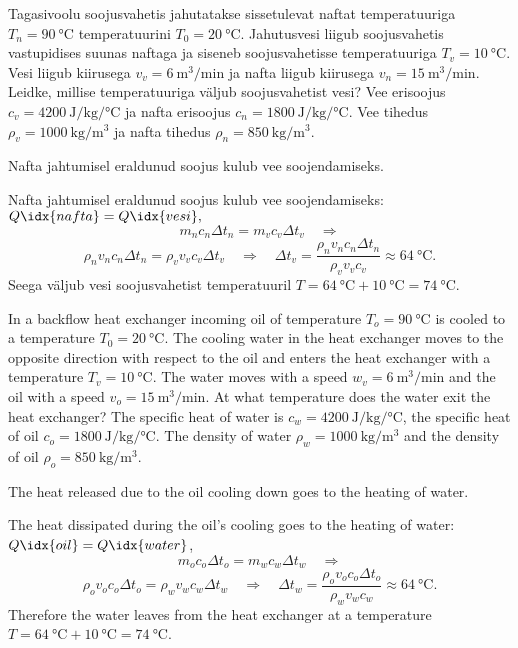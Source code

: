 
Tagasivoolu soojusvahetis jahutatakse sissetulevat naftat temperatuuriga $T_{n}=\SI{90}{\degreeCelsius}$ temperatuurini $T_{0}=\SI{20}{\degreeCelsius}$. 
Jahutusvesi liigub soojusvahetis vastupidises suunas naftaga ja siseneb soojusvahetisse temperatuuriga $T_{v}=\SI{10}{\degreeCelsius}$.
Vesi liigub kiirusega $v_{v}=\SI{6}{\m^3\per\minute}$ 
ja nafta liigub kiirusega $v_{n}=\SI{15}{\m^3\per\minute}$. 
Leidke, millise temperatuuriga väljub soojusvahetist vesi? Vee erisoojus $c_{v}=\SI{4200}{\joule\per\kilogram\per\degreeCelsius}$ 
ja nafta erisoojus $c_{n}=\SI{1800}{\joule\per\kilogram\per\degreeCelsius}$. Vee tihedus $\rho_{v}=\SI{1000}{\kilogram\per\metre\cubed}$ ja nafta tihedus $\rho_{n}=\SI{850}{\kilogram\per\metre\cubed}$.

\hint
Nafta jahtumisel eraldunud soojus kulub vee soojendamiseks.

\solu
Nafta jahtumisel eraldunud soojus kulub vee soojendamiseks: $Q\idx{nafta} = Q\idx{vesi},$
\[ m_nc_n\Delta t_n = m_vc_v\Delta t_v \quad\Rightarrow \]
\[ \rho_nv_nc_n\Delta t_n = \rho_v v_vc_v\Delta t_v \quad\Rightarrow\quad \Delta t_v = \frac{\rho_nv_nc_n\Delta t_n}{\rho_vv_vc_v} \approx \SI{64}{\degreeCelsius}. \]
Seega väljub vesi soojusvahetist temperatuuril $T = \SI{64}{\degreeCelsius} + \SI{10}{\degreeCelsius} = \SI{74}{\degreeCelsius}$.

In a backflow heat exchanger incoming oil of temperature $T_{o}=\SI{90}{\degreeCelsius}$ is cooled to a temperature $T_{0}=\SI{20}{\degreeCelsius}$. The cooling water in the heat exchanger moves to the opposite direction with respect to the oil and enters the heat exchanger with a temperature $T_{v}=\SI{10}{\degreeCelsius}$. The water moves with a speed $w_{v}=\SI{6}{\m^3\per\minute}$ and the oil with a speed $v_{o}=\SI{15}{\m^3\per\minute}$. At what temperature does the water exit the heat exchanger? The specific heat of water is $c_{w}=\SI{4200}{\joule\per\kilogram\per\degreeCelsius}$, the specific heat of oil $c_{o}=\SI{1800}{\joule\per\kilogram\per\degreeCelsius}$. The density of water $\rho_{w}=\SI{1000}{\kilogram\per\metre\cubed}$ and the density of oil $\rho_{o}=\SI{850}{\kilogram\per\metre\cubed}$.

\hinteng
The heat released due to the oil cooling down goes to the heating of water.

\solueng
The heat dissipated during the oil's cooling goes to the heating of water: $Q\idx{oil} = Q\idx{water}$,
\[ m_oc_o\Delta t_o = m_wc_w\Delta t_w \quad\Rightarrow \]
\[ \rho_ov_oc_o\Delta t_o = \rho_w v_wc_w\Delta t_w \quad\Rightarrow\quad \Delta t_w = \frac{\rho_ov_oc_o\Delta t_o}{\rho_wv_wc_w} \approx \SI{64}{\degreeCelsius}.  \]
Therefore the water leaves from the heat exchanger at a temperature $T = \SI{64}{\degreeCelsius} + \SI{10}{\degreeCelsius} = \SI{74}{\degreeCelsius}$.
\probend